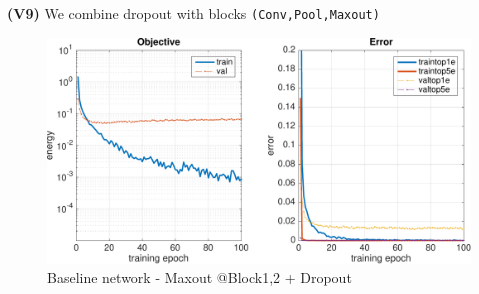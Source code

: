 \documentclass[11pt]{article}
\begin{document}
\textbf{(V9)} We combine dropout with blocks \texttt{(Conv,Pool,Maxout)}
	\begin{figure}[H]
	    \centering
	    \includegraphics[width=15cm]{v9}
	    \caption{Baseline network - Maxout @Block1,2 + Dropout}
	\end{figure}
\end{document}
